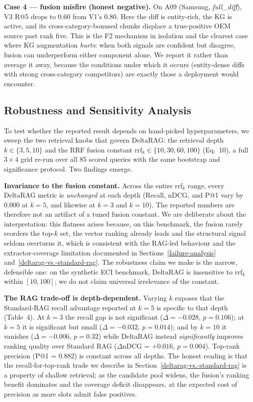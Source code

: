 \documentclass[
]{article}
\begin{document}
\noindent\textbf{Case 4 --- fusion misfire (honest negative).} On A09
(Samsung, \textit{full\_diff}), V3 R@5 drops to 0.60 from V1's 0.80. Here
the diff is entity-rich, the KG is active, and its cross-category-bonused
chunks displace a true-positive OEM source past rank five. This is the
F2 mechanism in isolation and the clearest case where KG augmentation
\emph{hurts}: when both signals are confident but disagree, fusion can
underperform either component alone. We report it rather than average it
away, because the conditions under which it occurs (entity-dense diffs
with strong cross-category competitors) are exactly those a deployment
would encounter.

\subsection{Robustness and Sensitivity Analysis}
\label{sensitivity-analysis}

To test whether the reported result depends on hand-picked
hyperparameters, we sweep the two retrieval knobs that govern DeltaRAG:
the retrieval depth $k \in \{3, 5, 10\}$ and the RRF fusion constant
$\mathrm{rrf}_k \in \{10, 30, 60, 100\}$ (Eq.~10), a full $3 \times 4$
grid re-run over all 85 scored queries with the same bootstrap and
significance protocol. Two findings emerge.

\noindent\textbf{Invariance to the fusion constant.} Across the entire
$\mathrm{rrf}_k$ range, every DeltaRAG metric is \emph{unchanged} at each
depth (Recall, nDCG, and P@1 vary by $0.000$ at $k = 5$, and likewise at
$k = 3$ and $k = 10$). The reported numbers are therefore not an artifact
of a tuned fusion constant. We are deliberate about the interpretation:
this flatness arises because, on this benchmark, the fusion rarely
reorders the top-$k$ set, the vector ranking already leads and the
structural signal seldom overturns it, which is consistent with the
RAG-led behaviour and the extractor-coverage limitation documented in
Sections~\ref{failure-analysis} and~\ref{deltarag-vs.-standard-rag}. The
robustness claim we make is the narrow, defensible one: on the synthetic
ECI benchmark, DeltaRAG is insensitive to $\mathrm{rrf}_k$ within
$[10, 100]$; we do not claim universal irrelevance of the constant.

\noindent\textbf{The RAG trade-off is depth-dependent.} Varying $k$
exposes that the Standard-RAG recall advantage reported at $k = 5$ is
specific to that depth (Table~4). At $k = 3$ the recall gap is not
significant ($\Delta = -0.028$, $p = 0.106$); at $k = 5$ it is
significant but small ($\Delta = -0.032$, $p = 0.014$); and by $k = 10$
it vanishes ($\Delta = -0.006$, $p = 0.32$) while DeltaRAG instead
\emph{significantly} improves ranking quality over Standard RAG
($\Delta$nDCG = $+0.016$, $p = 0.004$). Top-rank precision (P@1 = 0.882)
is constant across all depths. The honest reading is that the
recall-for-top-rank trade we describe in Section~\ref{deltarag-vs.-standard-rag}
is a property of shallow retrieval; as the candidate pool widens, the
fusion's ranking benefit dominates and the coverage deficit disappears,
at the expected cost of precision as more slots admit false positives.
\end{document}
